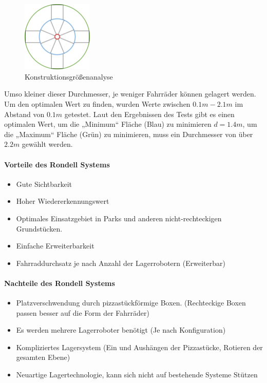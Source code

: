 \begin{figure}[H]
  \centering
  \includegraphics[width=0.3\textwidth]{images/konstruktionsgrößen.png}
  \caption{Konstruktionsgrößenanalyse}
  \label{fig:rondell_durchmesser}
\end{figure}

Umso kleiner dieser Durchmesser, je weniger Fahrräder können gelagert werden. Um den optimalen Wert zu finden, wurden Werte zwischen $0.1m-2.1m$ im Abstand von $0.1m$ getestet. Laut den Ergebnissen des Tests gibt es einen optimalen Wert, um die „Minimum“ Fläche (Blau) zu minimieren $d=1.4m$, um die „Maximum“ Fläche (Grün) zu minimieren, muss ein Durchmesser von über $2.2m$ gewählt werden.

\paragraph{Vorteile des Rondell Systems}
\begin{itemize}
  \item Gute Sichtbarkeit
  \item Hoher Wiedererkennungswert
  \item Optimales Einsatzgebiet in Parks und anderen nicht-rechteckigen Grundstücken.
  \item Einfache Erweiterbarkeit
  \item Fahrraddurchsatz je nach Anzahl der Lagerrobotern (Erweiterbar)
\end{itemize}

\paragraph{Nachteile des Rondell Systems}
\begin{itemize}
  \item Platzverschwendung durch pizzastückförmige Boxen. (Rechteckige Boxen passen besser auf die Form der Fahrräder)
  \item Es werden mehrere Lagerroboter benötigt (Je nach Konfiguration)
  \item Kompliziertes Lagersystem (Ein und Aushängen der Pizzastücke, Rotieren der gesamten Ebene)
  \item Neuartige Lagertechnologie, kann sich nicht auf bestehende Systeme Stützen
\end{itemize}
